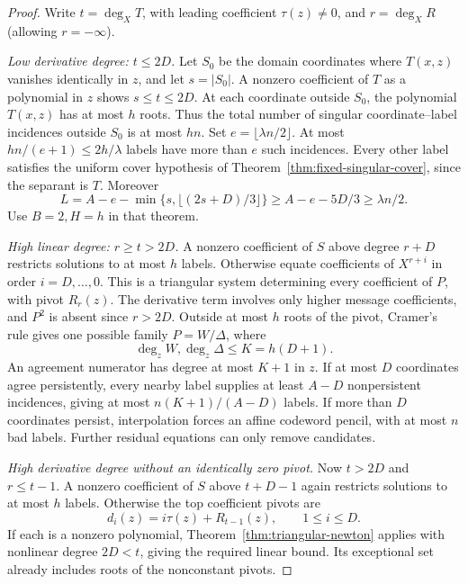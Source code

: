 \begin{proof}
Write $t=\deg_XT$, with leading coefficient $\tau(z)\ne0$, and
$r=\deg_XR$ (allowing $r=-\infty$).

\emph{Low derivative degree: $t\le2D$.}
Let $S_0$ be the domain coordinates where $T(x,z)$ vanishes identically
in $z$, and let $s=|S_0|$. A nonzero coefficient of $T$ as a polynomial
in $z$ shows $s\le t\le2D$. At each coordinate outside $S_0$, the
polynomial $T(x,z)$ has at most $h$ roots. Thus the total number of
singular coordinate--label incidences outside $S_0$ is at most $hn$.
Set $e=\lfloor\lambda n/2\rfloor$. At most
$hn/(e+1)\le2h/\lambda$ labels have more than $e$ such incidences.
Every other label satisfies the uniform cover hypothesis of
Theorem~\ref{thm:fixed-singular-cover}, since the separant is $T$.
Moreover
\[
 L=A-e-\min\{s,\lfloor(2s+D)/3\rfloor\}
 \ge A-e-5D/3\ge\lambda n/2.
\]
Use $B=2,H=h$ in that theorem.

\emph{High linear degree: $r\ge t>2D$.}
A nonzero coefficient of $S$ above degree $r+D$ restricts solutions to
at most $h$ labels. Otherwise equate coefficients of $X^{r+i}$ in
order $i=D,\ldots,0$. This is a triangular system determining every
coefficient of $P$, with pivot $R_r(z)$. The derivative term involves
only higher message coefficients, and $P^2$ is absent since $r>2D$.
Outside at most $h$ roots of the pivot, Cramer's rule gives one possible
family $P=W/\Delta$, where
\[
 \deg_zW,\deg_z\Delta\le K=h(D+1).
\]
An agreement numerator has degree at most $K+1$ in $z$. If at most $D$
coordinates agree persistently, every nearby label supplies at least
$A-D$ nonpersistent incidences, giving at most $n(K+1)/(A-D)$ labels.
If more than $D$ coordinates persist, interpolation forces an affine
codeword pencil, with at most $n$ bad labels. Further residual equations
can only remove candidates.

\emph{High derivative degree without an identically zero pivot.}
Now $t>2D$ and $r\le t-1$. A nonzero coefficient of $S$ above $t+D-1$
again restricts solutions to at most $h$ labels. Otherwise the top
coefficient pivots are
\[
 d_i(z)=i\tau(z)+R_{t-1}(z),\qquad 1\le i\le D.
\]
If each is a nonzero polynomial, Theorem~\ref{thm:triangular-newton}
applies with nonlinear degree $2D<t$, giving the required linear bound.
Its exceptional set already includes roots of the nonconstant pivots.


\end{proof}
